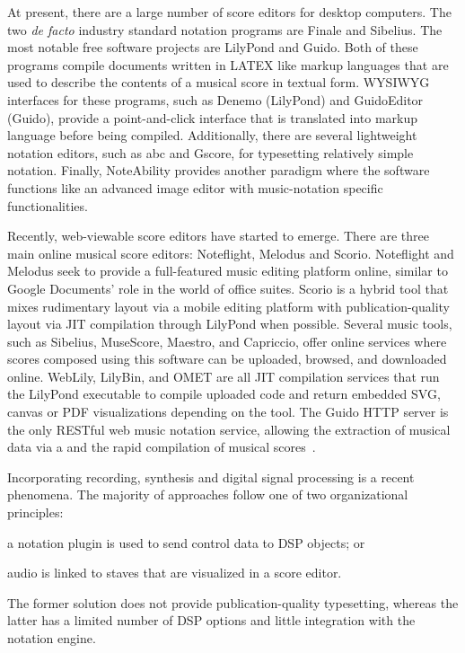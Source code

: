 \documentclass{article}
\begin{document}
At present, there are a large number of score editors for desktop computers.
The two \emph{de facto} industry standard notation programs are Finale and
Sibelius. The most notable free software projects are LilyPond and
Guido. Both of these programs compile documents written in LATEX like
markup languages that are used to describe the contents of a musical score
in textual form. WYSIWYG interfaces for these programs, such as Denemo
(LilyPond) and GuidoEditor (Guido), provide a point-and-click interface that
is translated into markup language before being compiled. Additionally,
there are several lightweight notation editors, such as abc and Gscore, for
typesetting relatively simple notation. Finally, NoteAbility provides
another paradigm where the software functions like an advanced image editor
with music-notation specific functionalities.

Recently, web-viewable score editors have started to emerge. There are three
main online musical score editors: Noteflight, Melodus and Scorio.
Noteflight and Melodus seek to provide a full-featured music editing
platform online, similar to Google Documents’ role in the world of office
suites. Scorio is a hybrid tool that mixes rudimentary layout via a mobile
editing platform with publication-quality layout via JIT compilation through
LilyPond when possible. Several music tools, such as Sibelius, MuseScore,
Maestro, and Capriccio, offer online services where scores composed using
this software can be uploaded, browsed, and downloaded online. WebLily,
LilyBin, and OMET are all JIT compilation services that run the LilyPond
executable to compile uploaded code and return embedded SVG, canvas or PDF
visualizations depending on the tool. The Guido HTTP server is the only RESTful
web music notation service, allowing the extraction of musical data via a
and the rapid compilation of musical scores~\cite{solomon:2014}.

Incorporating recording, synthesis and digital signal processing is a recent
phenomena.  The majority of approaches
follow one of two organizational principles:
\begin{inparaenum}[(1)]
\item a notation plugin is used to send control data to DSP objects; or
\item audio is linked to staves that are visualized in a score editor.
\end{inparaenum}
The former solution does not provide publication-quality typesetting,
whereas the latter has a limited number of DSP options and little
integration with the notation engine.
\end{document}
